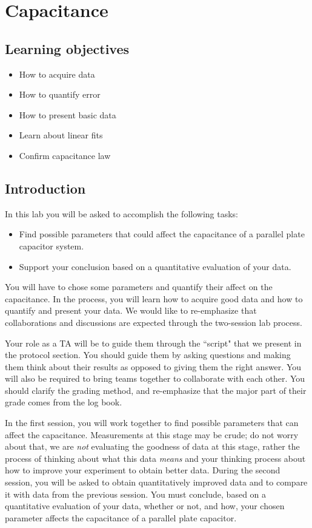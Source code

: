 \documentclass[12pt]{report}
\begin{document}
\chapter{Capacitance}
\section{Learning objectives}
\begin{itemize}
\item How to acquire data
\item How to quantify error
\item How to present basic data
\item Learn about linear fits
\item Confirm capacitance law
\end{itemize}


\section{Introduction}
In this lab you will be asked to accomplish the following tasks:
\begin{itemize}
\item Find possible parameters that could affect the capacitance of a parallel plate capacitor system.
\item Support your conclusion based on a quantitative evaluation of your data.
\end{itemize}

You will have to chose some parameters and quantify their affect on the capacitance. In the process, you will learn how to acquire good data and how to quantify and present your data. We would like to re-emphasize that collaborations and discussions are expected through the two-session lab process.

\begin{tcolorbox}[title=Role as a TA]
Your role as a TA will be to guide them through the ``script" that we present in the protocol section. You should guide them by asking questions and making them think about their results as opposed to giving them the right answer. You will also be required to bring teams together to collaborate with each other. You should clarify the grading method, and re-emphasize that the major part of their grade comes from the log book.
\end{tcolorbox}

In the first session, you will work together to find possible parameters that can affect the capacitance. Measurements at this stage may be crude; do not worry about that, we are {\it not} evaluating the goodness of data at this stage, rather the process of thinking about what this data {\it means} and your thinking process about how to improve your experiment to obtain better data. During the second session, you will be asked to obtain quantitatively improved data and to compare it with data from the previous session. You must conclude, based on a quantitative evaluation of your data, whether or not, and how, your chosen parameter affects the capacitance of a parallel plate capacitor.
\end{document}
